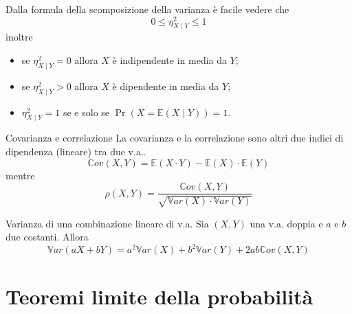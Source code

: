 Dalla formula della scomposizione della varianza è facile vedere che
\[
	0 \leq \eta_{X \mid Y}^2 \leq 1
\]
inoltre
\begin{itemize}
	\item se $\eta_{X \mid Y}^2=0$ allora $X$ è indipendente in media da $Y$;
	\item se $\eta_{X \mid Y}^2>0$ allora $X$ è dipendente in media da $Y$;
	\item $\eta_{X \mid Y}^2=1$ se e solo se $\Pr(X=\mathbb{E}(X \mid Y))=1$.
\end{itemize}
\begin{definizione}{Covarianza e correlazione}
	La covarianza e la correlazione sono altri due indici di dipendenza (lineare) tra due v.a..
	\[
		\mathbb{C}ov(X, Y)=\mathbb{E}(X \cdot Y)-\mathbb{E}(X) \cdot \mathbb{E}(Y)
	\]
	mentre
	\[
		\rho(X, Y)=\frac{\mathbb{C}ov(X, Y)}{\sqrt{\mathbb{V}ar(X) \cdot \mathbb{V} a r(Y)}}
	\]
\end{definizione}
\begin{teorema}{Varianza di una combinazione lineare di v.a.}
	Sia $(X, Y)$ una v.a. doppia e $ a $ e $ b $ due costanti. Allora
	\[
		\mathbb{V} a r(a X+b Y)=a^2 \mathbb{V} a r(X)+b^2 \mathbb{V} a r(Y)+2 a b \mathbb{C} o v(X, Y)
	\]
\end{teorema}
\section{Teoremi limite della probabilità}
